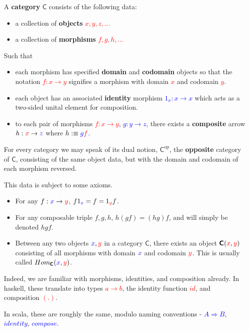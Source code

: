 \documentclass[tikz]{beamer}
\newcommand{\cat}[1]{\bm{ \mathsf{#1} }}
\newcommand{\cc}{\cat{C}}
\newcommand{\op}[1]{#1^{\text{op}}}
\newcommand{\opc}{\op{\cc}}
\newcommand{\red}[1]{\textcolor{red}{#1}}
\newcommand{\mred}[1]{\textcolor{red}{$#1$}}
\newcommand{\blue}[1]{\textcolor{blue}{#1}}
\newcommand{\mblue}[1]{\textcolor{blue}{$#1$}}
\theoremstyle{definition}
\begin{document}
\frame
{
	\begin{definition}[Category]
		A \textbf{category} $\cc$ consists of the following data: 
		
		\begin{itemize}
			\item a collection of \textbf{objects} \mred{x, y, z,...}
			\item a collection of \textbf{morphisms} \mred{f,g,h,...}
		\end{itemize}
		
		Such that 
		
		\begin{itemize}
			\item each morphism has specified \textbf{domain} and \textbf{codomain} objects so that the notation \mred{f : x \to y} signifies a morphism with domain \mred{x} and codomain \mred{y}. 
			\item each object has an associated \textbf{identity} morphism \mblue{1_x : x \to x} which acts as a two-sided unital element for composition.
			\item to each pair of morphisms \mred{f : x \to y}, \mblue{g : y \to z}, there exists a \textbf{composite} arrow $h : \red{x} \to \blue{z}$ where $h :\equiv \blue{g}\red{f}$. 
		\end{itemize}
	\end{definition}
}

\frame
{
	For every category we may speak of its dual notion, $\opc$, the \textbf{opposite} category of $\cc$, consisting of the same object data, but with the domain and codomain of each morphism reversed.
}

\frame
{
	This data is subject to some axioms. 
	
	\begin{itemize}
	
		\item For any $f : \blue{x} \to \red{y}$, $f1_{\blue{x}} = f =  1_{\red{y}} f$. 
		\item For any composable triple $f,g,h$, $h(gf) = (hg)f$, and will simply be denoted $hgf$.
		\item Between any two objects $\blue{x}, \red{y}$ in a category $\cc$, there exists an object $\cc(\red{x},\red{y})$ consisting of all morphisms with domain $\blue{x}$ and codomain $\red{y}$. This is usually called $Hom_{\cc}(\blue{x}, \red{y})$.
	\end{itemize}
}


\frame
{

	Indeed, we are familiar with morphisms, identities, and composition already. In haskell, these translate into types \mred{a \to b}, the identity function \mred{id}, and composition \mred{(.)}. 
	
	In scala, these are roughly the same, modulo naming conventions - \mblue{A \Rightarrow B}, \mblue{identity}, \mblue{compose}.  
}
\end{document}
